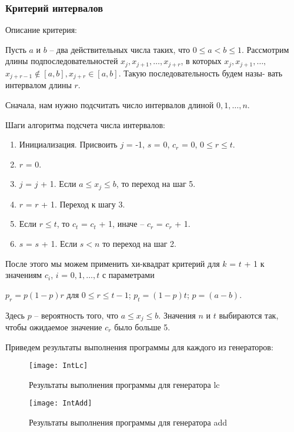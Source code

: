 \documentclass[bachelor, och, coursework]{shiza}
\begin{document}
	\subsubsection{Критерий интервалов}
		
	Описание критерия:
	
	Пусть $a$ и $b$ – два действительных числа таких, что $0 \leq a < b \leq 1$. Рассмотрим длины подпоследовательностей $x_j, x_{j + 1}, \dots, x_{j + r}$, в которых $x_j, x_{j + 1}, \dots,$ $x_{j + r - 1} \notin [a, b], x_{j + r} \in [a, b]$. Такую последовательность будем назы-
	вать интервалом длины $r$.
	
	Сначала, нам нужно подсчитать число интервалов длиной $0, 1, \dots, n$.
	
	Шаги алгоритма подсчета числа интервалов:
	\begin{enumerate}
		\item Инициализация. Присвоить $j$ = -1, $s$ = 0, $c_r$ = 0, $0 \leq r \leq t$.
		\item $r$ = 0.
		\item $j$ = $j$ + 1. Если $a \leq x_j \leq b$, то переход на шаг 5.
		\item $r$ = $r$ + 1. Переход к шагу 3.
		\item Если $r \leq t$, то $c_t$ = $c_t$ + 1, иначе – $c_r$ = $c_r$ + 1.
		\item $s$ = $s$ + 1. Если $s < n$  то переход на шаг 2.
	\end{enumerate}

	После этого мы можем применить хи-квадрат критерий для $k$ = $t$ + 1 к
	значениям $c_i$, $i$ = $0, 1, \dots , t$ с параметрами
			\begin{center}
				$p_r = p (1 - p) r$ для $0 \leq r \leq t - 1$;
				$p_t = (1 - p) t$;
				$p = (a - b)$.
			\end{center}	

	Здесь $p$ – вероятность того, что $a \leq x_j \leq b$. Значения $n$ и $t$ выбираются
	так, чтобы ожидаемое значение $c_r$ было больше 5. \
	
	Приведем результаты выполнения программы для каждого из генераторов:
	
	\begin{figure}[H]
		\centering
		\texttt{[image: IntLc]}
		\caption{Результаты выполнения программы для генератора lc}
		\label{fig:IntLc}
	\end{figure}
	
	\begin{figure}[H]
		\centering
		\texttt{[image: IntAdd]}
		\caption{Результаты выполнения программы для генератора add}
		\label{fig:IntAdd}
	\end{figure}
	
\end{document}
